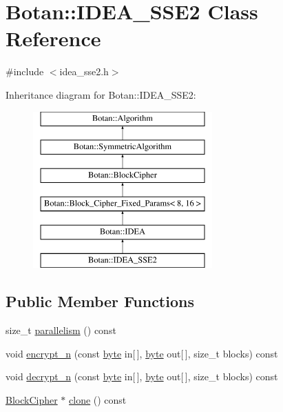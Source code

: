 \hypertarget{classBotan_1_1IDEA__SSE2}{\section{Botan\-:\-:I\-D\-E\-A\-\_\-\-S\-S\-E2 Class Reference}
\label{classBotan_1_1IDEA__SSE2}
}


{\ttfamily \#include $<$idea\-\_\-sse2.\-h$>$}

Inheritance diagram for Botan\-:\-:I\-D\-E\-A\-\_\-\-S\-S\-E2\-:\begin{figure}[H]
\begin{center}
\leavevmode
\includegraphics[height=6.000000cm]{classBotan_1_1IDEA__SSE2}
\end{center}
\end{figure}
\subsection*{Public Member Functions}
\begin{DoxyCompactItemize}
\item 
size\-\_\-t \hyperlink{classBotan_1_1IDEA__SSE2_abdddb2c041e84106060c9f07f0091e80}{parallelism} () const 
\item 
void \hyperlink{classBotan_1_1IDEA__SSE2_ab2b838764b9bf11185f5ecfd1c693b76}{encrypt\-\_\-n} (const \hyperlink{namespaceBotan_a7d793989d801281df48c6b19616b8b84}{byte} in\mbox{[}$\,$\mbox{]}, \hyperlink{namespaceBotan_a7d793989d801281df48c6b19616b8b84}{byte} out\mbox{[}$\,$\mbox{]}, size\-\_\-t blocks) const 
\item 
void \hyperlink{classBotan_1_1IDEA__SSE2_aefefdc1ba1d684f9a9a1cb099a20b109}{decrypt\-\_\-n} (const \hyperlink{namespaceBotan_a7d793989d801281df48c6b19616b8b84}{byte} in\mbox{[}$\,$\mbox{]}, \hyperlink{namespaceBotan_a7d793989d801281df48c6b19616b8b84}{byte} out\mbox{[}$\,$\mbox{]}, size\-\_\-t blocks) const 
\item 
\hyperlink{classBotan_1_1BlockCipher}{Block\-Cipher} $\ast$ \hyperlink{classBotan_1_1IDEA__SSE2_aa084a70118299c0a4c32a9d5ac35e870}{clone} () const 
\end{DoxyCompactItemize}
